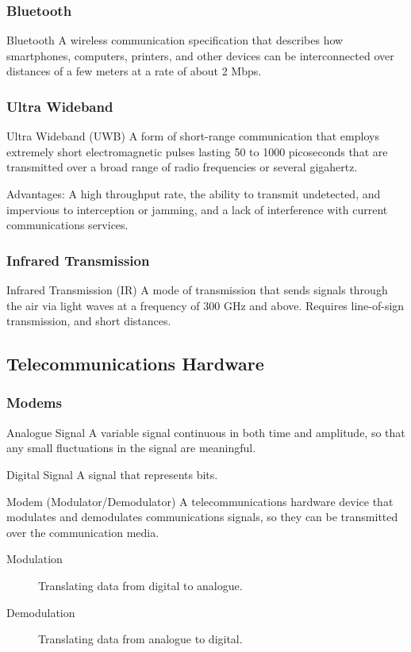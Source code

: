\documentclass[\main/notes.tex]{subfiles}
\begin{document}
				\subsubsection{Bluetooth}
					\begin{definition}{Bluetooth}
						A wireless communication specification that describes how smartphones, computers, printers, and other devices can be interconnected over distances of a few meters at a rate of about 2 Mbps.
					\end{definition}
				\subsubsection{Ultra Wideband}
					\begin{definition}{Ultra Wideband (UWB)}
						A form of short-range communication that employs extremely short electromagnetic pulses lasting 50 to 1000 picoseconds that are transmitted over a broad range of radio frequencies or several gigahertz.

						Advantages: A high throughput rate, the ability to transmit undetected, and impervious to interception or jamming, and a lack of interference with current communications services.
					\end{definition}
				\subsubsection{Infrared Transmission}
					\begin{definition}{Infrared Transmission (IR)}
						A mode of transmission that sends signals through the air via light waves at a frequency of 300 GHz and above. Requires line-of-sign transmission, and short distances.
					\end{definition}
			\pagebreak
			\subsection{Telecommunications Hardware}
				\subsubsection{Modems}
					\begin{definition}{Analogue Signal}
						A variable signal continuous in both time and amplitude, so that any small fluctuations in the signal are meaningful.
					\end{definition}
					\begin{definition}{Digital Signal}
						A signal that represents bits.
					\end{definition}
					\begin{definition}{Modem (Modulator/Demodulator)}
						A telecommunications hardware device that modulates and demodulates communications signals, so they can be transmitted over the communication media.
						\begin{description}
							\item[Modulation] Translating data from digital to analogue.
							\item[Demodulation] Translating data from analogue to digital. 
						\end{description}
					\end{definition}
\end{document}
